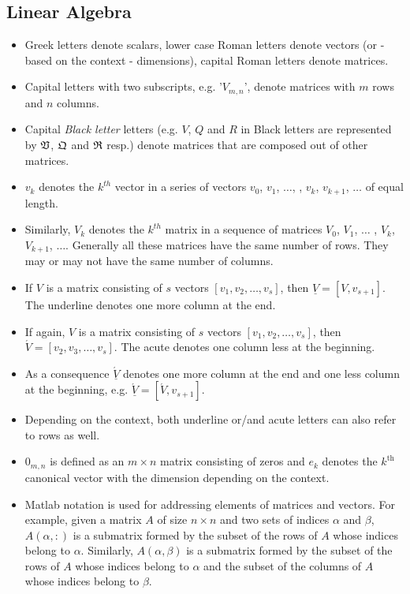 \documentclass{scrartcl}
\begin{document}
\subsection*{Linear Algebra}
\begin{itemize}
\item Greek letters denote scalars, lower case Roman letters denote vectors (or - based on the context - dimensions), capital Roman letters denote matrices.
\item Capital letters with two subscripts, e.g. '$V_{m, n}$', denote matrices with $m$ rows and $n$ columns.
\item Capital \textit{Black letter} letters (e.g. $V$, $Q$ and $R$ in Black letters are represented by $\frak{V}$, $\frak{Q}$ and $\frak{R}$ resp.) denote matrices that are composed out of other matrices. 
\item $v_k$ denotes the $k^{th}$ vector in a series of vectors $v_0$, $v_1$, $\ldots$, ,  $v_k$, $v_{k+1}$, $\ldots$ of equal length.
\item Similarly, $V_k$ denotes the $k^{th}$ matrix in a sequence of matrices $V_0$, $V_1$, $\ldots$ , $V_k$, $V_{k+1}$, $\ldots$. Generally all these matrices have the same number of rows. They may or may not have the same number of columns.
\item If $V$ is a matrix consisting of $s$ vectors $\left[v_1, v_2, \ldots, v_s\right]$, then $\underline{V} = \left[V, v_{s+1} \right]$. The underline denotes one more column at the end.
\item If again, $V$ is a matrix consisting of $s$ vectors $\left[v_1, v_2, \ldots, v_s\right]$, then $\acute{V} = [v_2, v_3, \ldots, v_s]$. The acute denotes one column less at the beginning.
\item As a consequence $\underline{\acute{V}}$ denotes one more column at the end and one less column at the beginning, e.g. $\underline{\acute{V}} = [\acute{V}, v_{s+1}]$.
\item Depending on the context, both underline or/and acute letters can also refer to rows as well. 
\item $0_{m, n}$ is defined as an $m \times n$ matrix consisting of zeros and $e_k$ denotes the $k^{\text{th}}$ canonical vector with the dimension depending on the context.
\item Matlab notation is used for addressing elements of matrices and vectors. For example, given a matrix $A$ of size $n \times n$ and two sets of indices $\alpha$ and $\beta$, $A(\alpha,:)$ is a submatrix formed by the subset of the rows of $A$ whose indices belong to $\alpha$. Similarly, $A(\alpha, \beta)$ is a submatrix formed by the subset of the rows of $A$ whose indices belong to $\alpha$ and the subset of the columns of $A$ whose indices belong to $\beta$.
\end{itemize}
\end{document}
